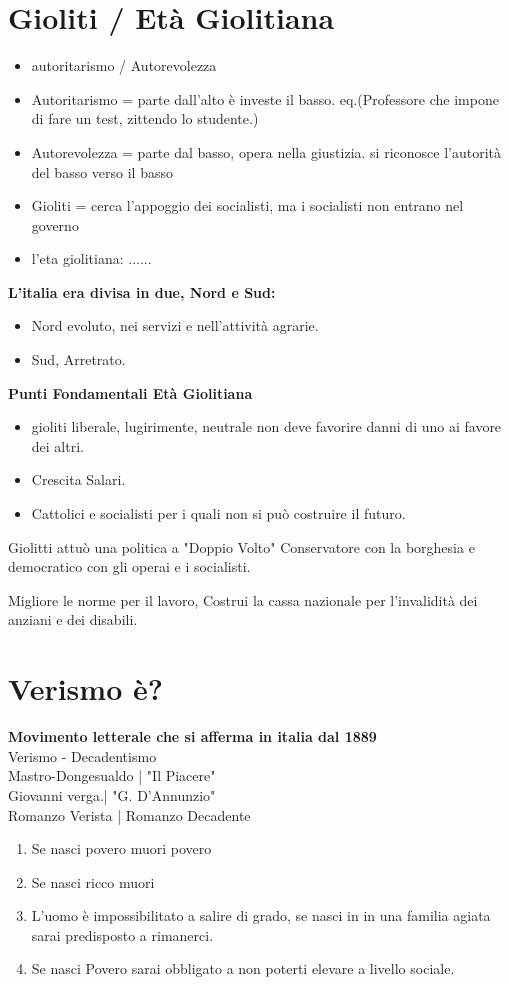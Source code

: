 \documentclass{article}
\begin{document}
\section{Gioliti / Età Giolitiana}

\begin{itemize}
    \item autoritarismo / Autorevolezza
    \item Autoritarismo = parte dall'alto è investe il basso. eq.(Professore che impone di fare un test, zittendo lo studente.)
    \item Autorevolezza = parte dal basso, opera nella giustizia. si riconosce l'autorità del basso verso il basso
    \item Gioliti = cerca l'appoggio dei socialisti, ma i socialisti non entrano nel governo
    \item l'eta giolitiana: ......
\end{itemize}

\textbf{L'italia era divisa in due, Nord e Sud:}
\begin{itemize}
  \item Nord evoluto, nei servizi e nell'attività agrarie.
  \item Sud, Arretrato.\\
\end{itemize}

\textbf{Punti Fondamentali Età Giolitiana}
\begin{itemize}
    \item gioliti liberale, lugirimente, neutrale non deve favorire danni di uno ai favore dei altri.
    \item Crescita Salari.
    \item Cattolici e socialisti per i quali non si può costruire il futuro.
\end{itemize}

Giolitti attuò una politica a "Doppio Volto"
Conservatore con la borghesia e democratico con gli operai e i socialisti.

Migliore le norme per il lavoro, Costrui la cassa nazionale per l'invalidità dei anziani e dei disabili.

\section{Verismo è?}
\textbf{Movimento letterale che si afferma in italia dal 1889}\\
Verismo - Decadentismo\\
Mastro-Dongesualdo | "Il Piacere"\\
Giovanni verga.| "G. D'Annunzio"\\
Romanzo Verista | Romanzo Decadente\\


\begin{enumerate}
    \item Se nasci povero muori povero
    \item Se nasci ricco muori 
    \item L'uomo è impossibilitato a salire di grado, se nasci in in una familia agiata sarai predisposto a rimanerci.
    \item Se nasci Povero sarai obbligato a non poterti elevare a livello sociale.
\end{enumerate}
\end{document}
